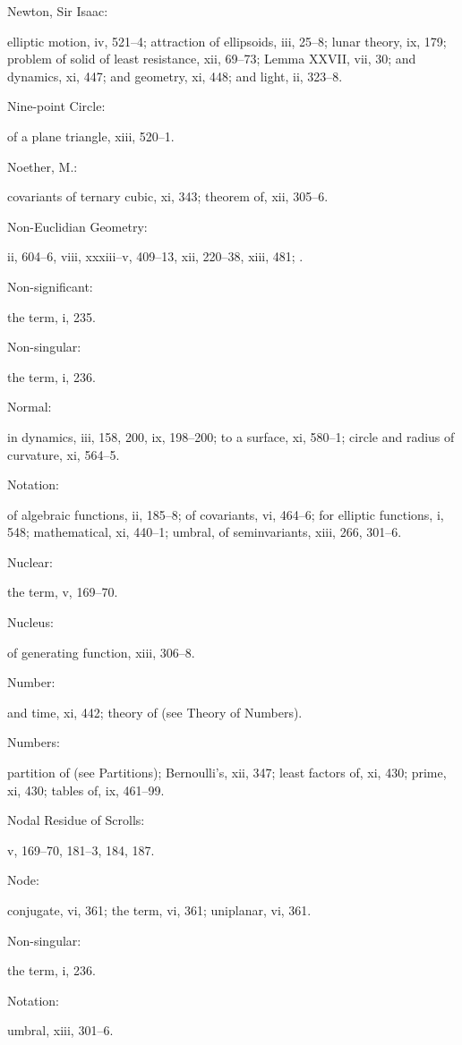 \documentclass[11pt,a4paper]{book}
\providecommand{\V}[1]{#1}
\providecommand{\IndexEntry}[2]{#1\dotfill #2\par}
\begin{document}
\IndexEntry{Newton, Sir Isaac}: elliptic motion, \V{iv}, 521--4; attraction of ellipsoids, \V{iii}, 25--8; lunar theory, \V{ix}, 179; problem of solid of least resistance, \V{xii}, 69--73; Lemma XXVII, \V{vii}, 30; and dynamics, \V{xi}, 447; and geometry, \V{xi}, 448; and light, \V{ii}, 323--8.

\IndexEntry{Nine-point Circle}: of a plane triangle, \V{xiii}, 520--1.

\IndexEntry{Noether, M.}: covariants of ternary cubic, \V{xi}, 343; theorem of, \V{xii}, 305--6.

\IndexEntry{Non-Euclidian Geometry}: \V{ii}, 604--6, \V{viii}, xxxiii--v, 409--13, \V{xii}, 220--38, \V{xiii}, 481; .

\IndexEntry{Non-significant}: the term, \V{i}, 235.

\IndexEntry{Non-singular}: the term, \V{i}, 236.

\IndexEntry{Normal}: in dynamics, \V{iii}, 158, 200, \V{ix}, 198--200; to a surface, \V{xi}, 580--1; circle and radius of curvature, \V{xi}, 564--5.

\IndexEntry{Notation}: of algebraic functions, \V{ii}, 185--8; of covariants, \V{vi}, 464--6; for elliptic functions, \V{i}, 548; mathematical, \V{xi}, 440--1; umbral, of seminvariants, \V{xiii}, 266, 301--6.

\IndexEntry{Nuclear}: the term, \V{v}, 169--70.

\IndexEntry{Nucleus}: of generating function, \V{xiii}, 306--8.

\IndexEntry{Number}: and time, \V{xi}, 442; theory of (see Theory of Numbers).

\IndexEntry{Numbers}: partition of (see Partitions); Bernoulli's, \V{xii}, 347; least factors of, \V{xi}, 430; prime, \V{xi}, 430; tables of, \V{ix}, 461--99.

\newpage

\setcounter{page}{114}

\IndexEntry{Nodal Residue of Scrolls}: \V{v}, 169--70, 181--3, 184, 187.

\IndexEntry{Node}: conjugate, \V{vi}, 361; the term, \V{vi}, 361; uniplanar, \V{vi}, 361.

\IndexEntry{Non-singular}: the term, \V{i}, 236.

\IndexEntry{Notation}: umbral, \V{xiii}, 301--6.
\end{document}
